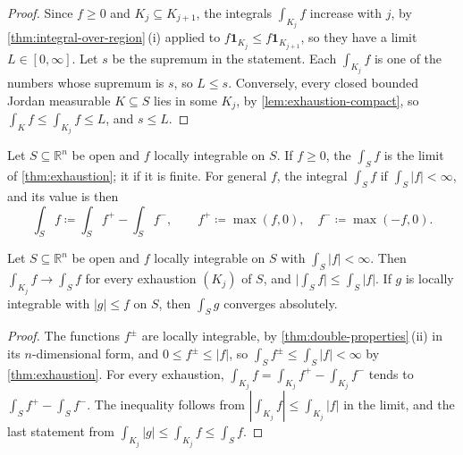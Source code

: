 \begin{proof}
Since $f\ge0$ and $K_j\subseteq K_{j+1}$, the integrals $\int_{K_j}f$ increase with $j$, by \cref{thm:integral-over-region}\,(i) applied to $f\mathbf 1_{K_j}\le f\mathbf 1_{K_{j+1}}$, so they have a limit $L\in[0,\infty]$. Let $s$ be the supremum in the statement. Each $\int_{K_j}f$ is one of the numbers whose supremum is $s$, so $L\le s$. Conversely, every closed bounded Jordan measurable $K\subseteq S$ lies in some $K_j$, by \cref{lem:exhaustion-compact}, so $\int_Kf\le\int_{K_j}f\le L$, and $s\le L$.
\end{proof}

\begin{definition}
\label{def:improper-multiple}
Let $S\subseteq\mathbb R^n$ be open and $f$ locally integrable on $S$. If $f\ge0$, the  $\int_Sf$ is the limit of \cref{thm:exhaustion}; it  if it is finite. For general $f$, the integral $\int_Sf$  if $\int_S|f|<\infty$, and its value is then
\[
\int_Sf\coloneqq\int_Sf^+-\int_Sf^-,\qquad f^+\coloneqq\max(f,0),\quad f^-\coloneqq\max(-f,0).
\]
\end{definition}

\begin{theorem}
\label{thm:absolute-multiple}
Let $S\subseteq\mathbb R^n$ be open and $f$ locally integrable on $S$ with $\int_S|f|<\infty$. Then $\int_{K_j}f\to\int_Sf$ for every exhaustion $(K_j)$ of $S$, and $\bigl|\int_Sf\bigr|\le\int_S|f|$. If $g$ is locally integrable with $|g|\le f$ on $S$, then $\int_Sg$ converges absolutely.
\end{theorem}

\begin{proof}
The functions $f^\pm$ are locally integrable, by \cref{thm:double-properties}\,(ii) in its $n$-dimensional form, and $0\le f^\pm\le|f|$, so $\int_Sf^\pm\le\int_S|f|<\infty$ by \cref{thm:exhaustion}. For every exhaustion, $\int_{K_j}f=\int_{K_j}f^+-\int_{K_j}f^-$ tends to $\int_Sf^+-\int_Sf^-$. The inequality follows from $|\int_{K_j}f|\le\int_{K_j}|f|$ in the limit, and the last statement from $\int_{K_j}|g|\le\int_{K_j}f\le\int_Sf$.
\end{proof}


